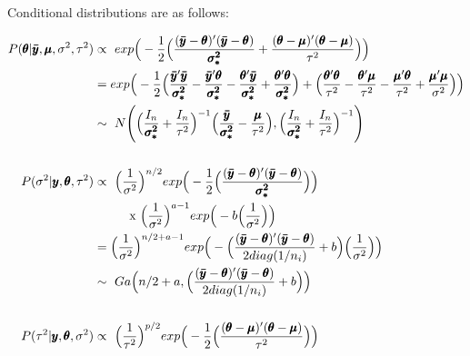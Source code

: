 \documentclass[12pt,letterpaper]{article}\usepackage[]{graphicx}\usepackage[]{color}
\begin{document}
Conditional distributions are as follows:

\begin{align*}
P(\pmb{\theta}|\pmb{\bar{y}},\pmb{\mu}, \sigma^2, \tau^2) 
  &\propto\ exp \Big( -\frac{1}{2} \Big( \dfrac{(\pmb{\bar{y}}-\pmb{\theta})'
		(\pmb{\bar{y}}-\pmb{\theta})} {\pmb{\sigma_{*}^{2}}} + 
		\dfrac{(\pmb{\theta}-\pmb{\mu})'(\pmb{\theta}-\pmb{\mu})} {\tau^2}
		\Big) \Big)\\
	&= exp \Big( -\frac{1}{2} \Big( 
		\dfrac{\pmb{\bar{y}}'\pmb{\bar{y}}}{\pmb{\sigma_{*}^{2}}} -
    \dfrac{\pmb{\bar{y}}'\pmb{\theta}}{\pmb{\sigma_{*}^{2}}} -
    \dfrac{\pmb{\theta}'\pmb{\bar{y}}}{\pmb{\sigma_{*}^{2}}} +
    \dfrac{\pmb{\theta}'\pmb{\theta}}{\pmb{\sigma_{*}^{2}}} \Big) + \Big(
    \dfrac{\pmb{\theta}'\pmb{\theta}}{\tau^2} -
    \dfrac{\pmb{\theta}'\pmb{\mu}}{\tau^2} -
    \dfrac{\pmb{\mu}'\pmb{\theta}}{\tau^2} +
    \dfrac{\pmb{\mu}'\pmb{\mu}}{\sigma^2} \Big)
    \Big)\\
	&\sim\ N \Bigg( \Big( 
    \frac{I_n}{\pmb{\sigma_{*}^{2}}} +  \frac{I_n}{\tau^2} \Big) ^{-1}
		\Big( \frac{\pmb{\bar{y}}}{\pmb{\sigma_{*}^{2}}} - 
      \frac{\pmb{\mu}}{\tau^2} \Big) , 
		\Big( \frac{I_n}{\pmb{\sigma_{*}^{2}}} + \frac{I_n}{\tau^2} \Big) ^{-1}
		\Bigg)\\
\vspace{10mm}\\
P(\sigma^2|\pmb{y},\pmb{\theta},\tau^2) &\propto\
	\Big( \dfrac{1}{\sigma^2} \Big) ^{n/2}
	exp \Big( -\frac{1}{2} \Big( \dfrac{(\pmb{\bar{y}}-\pmb{\theta})'
			(\pmb{\bar{y}}-\pmb{\theta})} {\pmb{\sigma_{*}^{2}}} \Big) \Big)\\
	& \hspace{10mm} \text{x } \Big( \dfrac{1}{\sigma^2} \Big) 
			^{a-1} exp \Big( -b \Big( \dfrac{1}{\sigma^2} \Big) \Big)\\
	&= \Big( \dfrac{1}{\sigma^2} \Big) ^{n/2 + a -1}
		exp \Big( - \Big( \dfrac{(\pmb{\bar{y}}-\pmb{\theta})'
			(\pmb{\bar{y}}-\pmb{\theta})} {2 diag(1/n_i)} + b \Big)
			\Big( \frac{1}{\sigma^2} \Big) \Big)\\
	&\sim\ Ga \Big( n/2+a, \Big( \dfrac{(\pmb{\bar{y}}-\pmb{\theta})'
			(\pmb{\bar{y}}-\pmb{\theta})} {2 diag(1/n_i)} + b \Big) \Big)\\
\vspace{10mm}\\
P(\tau^2|\pmb{y},\pmb{\theta},\sigma^2) &\propto\
	\Big( \dfrac{1}{\tau^2} \Big) ^{p/2}
	exp \Big( -\frac{1}{2} \Big( \dfrac{(\pmb{\theta}-\pmb{\mu})'
    (\pmb{\theta}-\pmb{\mu})}{\tau^2}	\Big) \Big)\\

\end{align*}
\end{document}

